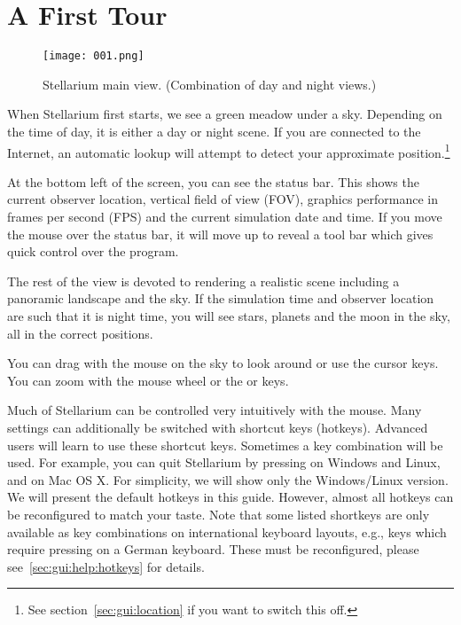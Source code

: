 

\chapter{A First Tour}
\label{ch:tour}


\begin{figure}[tbh]\centering
\texttt{[image: 001.png]}
\caption{Stellarium main view. (Combination of day and night views.)}
\label{fig:001}
\end{figure}

\noindent When Stellarium first starts, we see a green meadow under a
sky. Depending on the time of day, it is either a day or night
scene. If you are connected to the Internet, an automatic lookup will
attempt to detect your approximate position.\footnote{See
  section~\ref{sec:gui:location} if you want to switch this off.}

At the bottom left of the screen, you can see the status bar. This shows
the current observer location, vertical field of view (FOV), graphics performance
in frames per second (FPS) and the current simulation date and time.
If you move the mouse over the status bar, it will move up to reveal a
tool bar which gives quick control over the program.

The rest of the view is devoted to rendering a realistic scene including
a panoramic landscape and the sky. If the simulation time and observer
location are such that it is night time, you will see stars, planets and
the moon in the sky, all in the correct positions.

You can drag with the mouse on the sky to look around or use the
cursor keys. You can zoom with the mouse wheel or the  or  keys.

Much of Stellarium can be controlled very intuitively with the
mouse. Many settings can additionally be switched with shortcut keys
(hotkeys).  Advanced users will learn to use these shortcut
keys. Sometimes a key combination will be used. For example, you can
quit Stellarium by pressing  on Windows and Linux, and
 on Mac OS X.  For simplicity, we will show only the
Windows/Linux version. We will present the default hotkeys in this
guide. However, almost all hotkeys can be reconfigured to match your
taste. Note that some listed shortkeys are only available as key
combinations on international keyboard layouts, e.g., keys which
require pressing  on a German keyboard. These must be
reconfigured, please see~\ref{sec:gui:help:hotkeys} for details.


